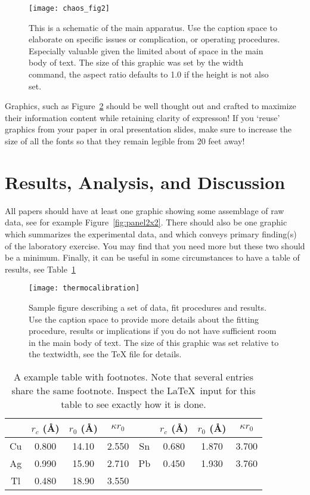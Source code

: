 \documentclass[aps,twocolumn,secnumarabic,nobalancelastpage,amsmath,amssymb,nofootinbib]{revtex4}
\begin{document}
\begin{figure}
\texttt{[image: chaos\_fig2]}
\caption{This is a schematic of the main apparatus.  Use the caption
space to elaborate on specific issues or complication, or operating
procedures.  Especially valuable given the limited about of space in
the main body of text.  The size of this graphic was set by the width
command, the aspect ratio defaults to 1.0 if the height is not also
set. \label{fig:samplefig}}
\end{figure}

Graphics, such as Figure~\ref{fig:calibration} should be well thought
out and crafted to maximize their information content while retaining
clarity of expresson!  If you `reuse' graphics from your paper in oral
presentation slides, make sure to increase the size of all the fonts
so that they remain legible from 20 feet away!


\section{Results, Analysis, and Discussion}

All papers should have at least one graphic showing some assemblage of
raw data, see for example Figure~\ref{fig:panel2x2}. There should also
be one graphic which summarizes the experimental data, and which
conveys primary finding(s) of the laboratory exercise.  You may find
that you need more but these two should be a minimum.  Finally, it can
be useful in some circumstances to have a table of results, see
Table~\ref{tab:table1}


\begin{figure}[h]
\texttt{[image: thermocalibration]}
\caption{Sample figure describing a set of data, fit procedures and
results. Use the caption space to provide more details about the
fitting procedure, results or implications if you do not have
sufficient room in the main body of text.  The size of this graphic
was set relative to the textwidth, see the TeX file for details.}
\label{fig:calibration}
\end{figure}


\begin{table}[h]
\caption{\label{tab:table1}A example table with footnotes.  Note that several 
entries share the same
footnote. Inspect the \LaTeX\ input for this table to see
exactly how it is done.}
\begin{ruledtabular}
\begin{tabular}{cccccccc}
 &$r_c$ (\AA)&$r_0$ (\AA)&$\kappa r_0$&
 &$r_c$ (\AA) &$r_0$ (\AA)&$\kappa r_0$\\
\hline
Cu& 0.800 & 14.10 & 2.550 &Sn\footnotemark[1] & 0.680 & 1.870 & 3.700 \\
Ag& 0.990 & 15.90 & 2.710 &Pb\footnotemark[1] & 0.450 & 1.930 & 3.760 \\
Tl& 0.480 & 18.90 & 3.550 & & & & \\
\end{tabular}
\end{ruledtabular}
\end{table}
\end{document}
